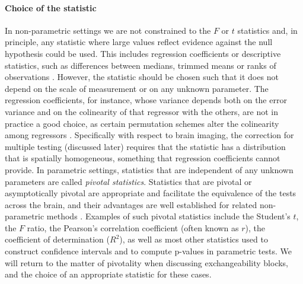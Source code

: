 \paragraph{Choice of the statistic} In non-parametric settings we are not constrained to the $F$ or $t$ statistics and, in principle, any statistic where large values reflect evidence against the null hypothesis could be used. This includes regression coefficients or descriptive statistics, such as differences between medians, trimmed means or ranks of observations \citep{Ernst2004}. However, the statistic should be chosen such that it does not depend on the scale of measurement or on any unknown parameter. The regression coefficients, for instance, whose variance depends both on the error variance and on the colinearity of that regressor with the others, are not in practice a good choice, as certain permutation schemes alter the colinearity among regressors \citep{Kennedy1996}. Specifically with respect to brain imaging, the correction for multiple testing (discussed later) requires that the statistic has a distribution that is spatially homogeneous, something that regression coefficients cannot provide. In parametric settings, statistics that are independent of any unknown parameters are called \emph{pivotal statistics}. Statistics that are pivotal or asymptotically pivotal are appropriate and facilitate the equivalence of the tests across the brain, and their advantages are well established for related non-parametric methods \citep{Hall1991, Westfall1993}. Examples of such pivotal statistics include the Student's $t$, the $F$ ratio, the Pearson's correlation coefficient (often known as $r$), the coefficient of determination ($R^2$), as well as most other statistics used to construct confidence intervals and to compute p-values in parametric tests. We will return to the matter of pivotality when discussing exchangeability blocks, and the choice of an appropriate statistic for these cases.

